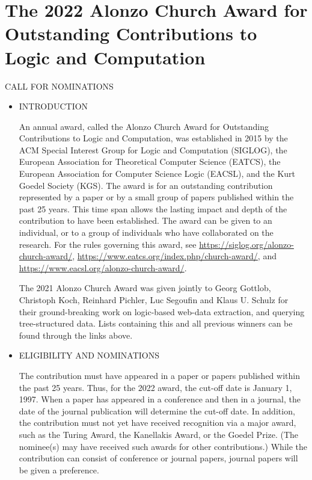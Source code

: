 \documentclass[prodmode,acmtecs]{acmsmall} %
\begin{document}
\section{The 2022 Alonzo Church Award for Outstanding Contributions to Logic and Computation}\label{The2022AlonzoChurchAwardforOutstandingContributionstoLogicandComputation}CALL FOR NOMINATIONS 

\begin{itemize}\item  INTRODUCTION 
 
  An annual award, called the Alonzo Church Award for Outstanding Contributions to Logic and Computation, was established in 2015 by the ACM Special Interest Group for Logic and Computation (SIGLOG), the European Association for Theoretical Computer Science (EATCS), the European Association for Computer Science Logic (EACSL), and the Kurt Goedel Society (KGS). The award is for an outstanding contribution represented by a paper or by a small group of papers published within the past 25 years. This time span allows the lasting impact and depth of the contribution to have been established. The award can be given to an individual, or to a group of individuals who have collaborated on the research. For the rules governing this award, see \href{https://siglog.org/alonzo-church-award/}{https://siglog.org/alonzo-church-award/}, \href{https://www.eatcs.org/index.php/church-award/}{https://www.eatcs.org/index.php/church-award/}, and \href{https://www.eacsl.org/alonzo-church-award/}{https://www.eacsl.org/alonzo-church-award/}. 
 
  The 2021 Alonzo Church Award was given jointly to Georg Gottlob, Christoph Koch, Reinhard Pichler, Luc Segoufin and Klaus U. Schulz for their ground-breaking work on logic-based web-data extraction, and querying tree-structured data. Lists containing this and all previous winners can be found through the links above.  
 
\item  ELIGIBILITY AND NOMINATIONS 
 
  The contribution must have appeared in a paper or papers published within the past 25 years. Thus, for the 2022 award, the cut-off date is January 1, 1997. When a paper has appeared in a conference and then in a journal, the date of the journal publication will determine the cut-off date. In addition, the contribution must not yet have received recognition via a major award, such as the Turing Award, the Kanellakis Award, or the Goedel Prize. (The nominee(s) may have received such awards for other contributions.) While the contribution can consist of conference or journal papers, journal papers will be given a preference. 
 

\end{itemize}
\end{document}
